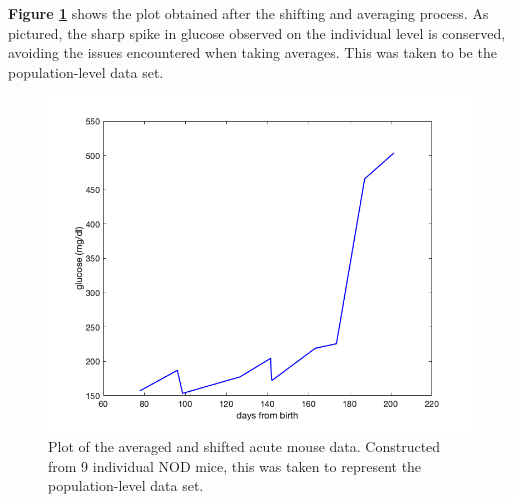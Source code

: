 \par \textbf{Figure \ref{fig:4prob}} shows the plot obtained after the shifting and averaging process. As pictured, the sharp spike in glucose observed on the individual level is conserved, avoiding the issues encountered when taking averages. This was taken to be the population-level data set. 
\begin{figure}[H]
    \centering
    \includegraphics[width=15cm]{Model_Setup_Images/avg_raw_plot.png}
    \caption{Plot of the averaged and shifted acute mouse data. Constructed from 9 individual NOD mice, this was taken to represent the population-level data set.}
    \label{fig:4prob}
\end{figure}
